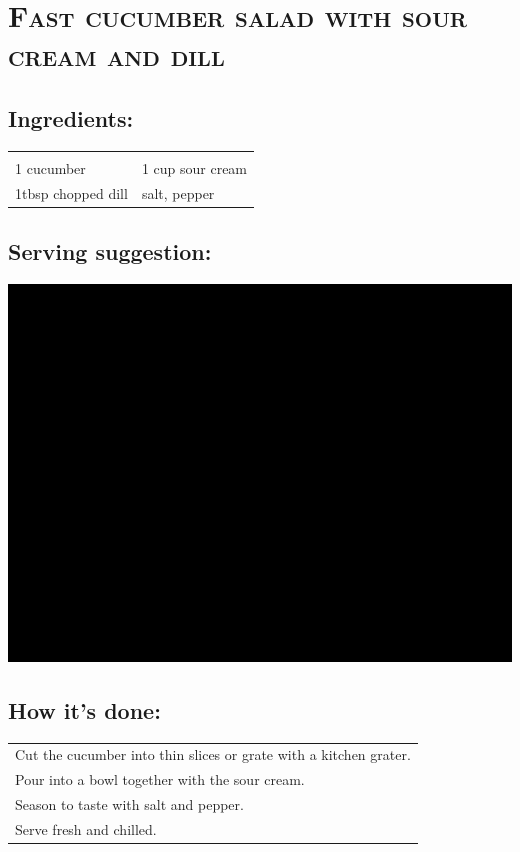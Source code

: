 \section{\textsc{Fast cucumber salad with sour cream and dill}}

\subsection*{Ingredients:}

\begin{tabular}{p{7.5cm} p{7.5cm}}
	& \\
	1 cucumber & 1 cup sour cream \\
	1tbsp chopped dill & salt, pepper
\end{tabular}

\subsection*{Serving suggestion:}

\includegraphics[width=\textwidth]{img/ph.jpg} \cite{gurkensalatdill}

\subsection*{How it's done:}

\begin{tabular}{p{15cm}}
	\\
  Cut the cucumber into thin slices or grate with a kitchen grater.\\
  Pour into a bowl together with the sour cream.\\
  Season to taste with salt and pepper.\\
  Serve fresh and chilled.
\end{tabular}
